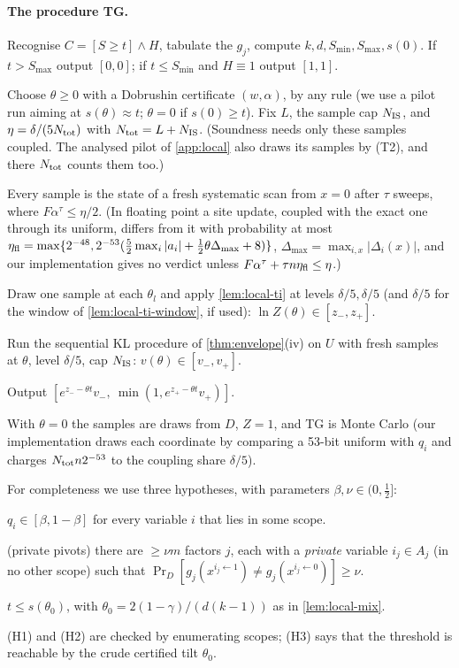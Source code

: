 \paragraph{The procedure TG.}
\begin{description}[style=sameline,leftmargin=1.5em]
\item[(T0)] Recognise $C=[S\ge t]\wedge H$, tabulate the $g_j$, compute $k,d,S_{\min},S_{\max},s(0)$.
If $t>S_{\max}$ output $[0,0]$; if $t\le S_{\min}$ and $H\equiv1$ output $[1,1]$.
\item[(T1)] Choose $\theta\ge0$ with a Dobrushin certificate $(w,\alpha)$, by any rule (we
use a pilot run aiming at $s(\theta)\approx t$; $\theta=0$ if $s(0)\ge t$). Fix $L$, the
sample cap $N_{\rm IS}$, and $\eta=\delta/(5N_{\rm tot})$ with $N_{\rm tot}=L+N_{\rm IS}$.
(Soundness needs only these samples coupled. The analysed pilot of \cref{app:local}
also draws its samples by (T2), and there $N_{\rm tot}$ counts them too.)
\item[(T2)] Every sample is the state of a fresh systematic scan from $x=0$ after
$\tau$ sweeps, where $F\alpha^\tau\le\eta/2$. (In floating point a site update, coupled
with the exact one through its uniform, differs from it with probability at most
$\eta_{\rm fl}=\max\{2^{-48},2^{-53}(\frac52\max_i|a_i|+\frac12\theta\Delta_{\max}+8)\}$,
$\Delta_{\max}=\max_{i,x}|\Delta_i(x)|$, and our implementation gives no verdict unless
$F\alpha^\tau+\tau n\eta_{\rm fl}\le\eta$.)
\item[(T3)] Draw one sample at each $\theta_l$ and apply \cref{lem:local-ti} at levels
$\delta/5,\delta/5$ (and $\delta/5$ for the window of \cref{lem:local-ti-window}, if used):
$\ln Z(\theta)\in[z_-,z_+]$.
\item[(T4)] Run the sequential KL procedure of \cref{thm:envelope}(iv) on $U$ with fresh
samples at $\theta$, level $\delta/5$, cap $N_{\rm IS}$: $v(\theta)\in[v_-,v_+]$.
\item[(T5)] Output $[e^{z_--\theta t}v_-,\ \min(1,e^{z_+-\theta t}v_+)]$.
\end{description}
With $\theta=0$ the samples are draws from $D$, $Z=1$, and TG is Monte Carlo (our
implementation draws each coordinate by comparing a 53-bit uniform with $q_i$ and charges
$N_{\rm tot}n2^{-53}$ to the coupling share $\delta/5$).

For completeness we use three hypotheses, with parameters $\beta,\nu\in(0,\frac12]$:
\begin{description}[style=sameline,leftmargin=1.5em]
\item[(H1)] $q_i\in[\beta,1-\beta]$ for every variable $i$ that lies in some scope.
\item[(H2)] (private pivots) there are $\ge\nu m$ factors $j$, each with a \emph{private}
variable $i_j\in A_j$ (in no other scope) such that
$\Pr_D[g_j(x^{i_j\gets1})\ne g_j(x^{i_j\gets0})]\ge\nu$.
\item[(H3)] $t\le s(\theta_0)$, with $\theta_0=2(1-\gamma)/(d(k-1))$ as in \cref{lem:local-mix}.
\end{description}
(H1) and (H2) are checked by enumerating scopes; (H3) says that the threshold is
reachable by the crude certified tilt $\theta_0$.


